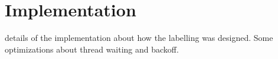 \chapter{Implementation}

details of the implementation about how the labelling was designed. Some optimizations about thread waiting and backoff. 

